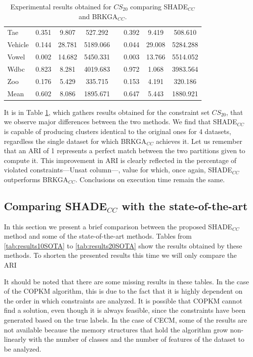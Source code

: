 \documentclass[review]{elsarticle}
\begin{document}
\begin{table}[!h]
{\begin{tabular}{l ccc c ccc}
			Tae & 0.351 & 9.807 & 527.292 && 0.392 & 9.419 & 508.610 \\
			Vehicle & 0.144 & 28.781 & 5189.066 && 0.044 & 29.008 & 5284.288 \\
			Vowel & 0.002 & 14.682 & 5450.331 && 0.003 & 13.766 & 5514.052 \\
			Wdbc & 0.823 & 8.281 & 4019.683 && 0.972 & 1.068 & 3983.564 \\
			Zoo & 0.176 & 5.429 & 335.715 && 0.153 & 4.191 & 320.186 \\
			\hline
			Mean & 0.602 & 8.086 & 1895.671 && 0.647 & 5.443 & 1880.921 \\
			\hline

		\end{tabular}}

	\caption{Experimental results obtained for $CS_{20}$ comparing SHADE$_{CC}$ and BRKGA$_{CC}$.}
	\label{tab:results20}
\end{table}

It is in Table \ref{tab:results20}, which gathers results obtained for the constraint set $CS_{20}$, that we observe major differences between the two methods. We find that SHADE$_{CC}$ is capable of producing clusters identical to the original ones for 4 datasets, regardless the single dataset for which BRKGA$_{CC}$ achieves it. Let us remember that an ARI of 1 represents a perfect match between the two partitions given to compute it. This improvement in ARI is clearly reflected in the percentage of violated constraints---Unsat column---, value for which, once again, SHADE$_{CC}$ outperforms BRKGA$_{CC}$. Conclusions on execution time remain the same.

\clearpage

\subsection{Comparing SHADE$_{CC}$ with the state-of-the-art} \label{sec:SHADEvsSOTA}

In this section we present a brief comparison between the proposed SHADE$_{CC}$ method and some of the state-of-the-art methods. Tables from \ref{tab:results10SOTA} to \ref{tab:results20SOTA} show the results obtained by these methods. To shorten the presented results this time we will only compare the ARI

It should be noted that there are some missing results in these tables. In the case of the COPKM algorithm, this is due to the fact that it is highly dependent on the order in which constraints are analyzed. It is possible that COPKM cannot find a solution, even though it is always feasible, since the constraints have been generated based on the true labels. In the case of CECM, some of the results are not available because the memory structures that hold the algorithm grow non-linearly with the number of classes and the number of features of the dataset to be analyzed.
	
\end{document}
